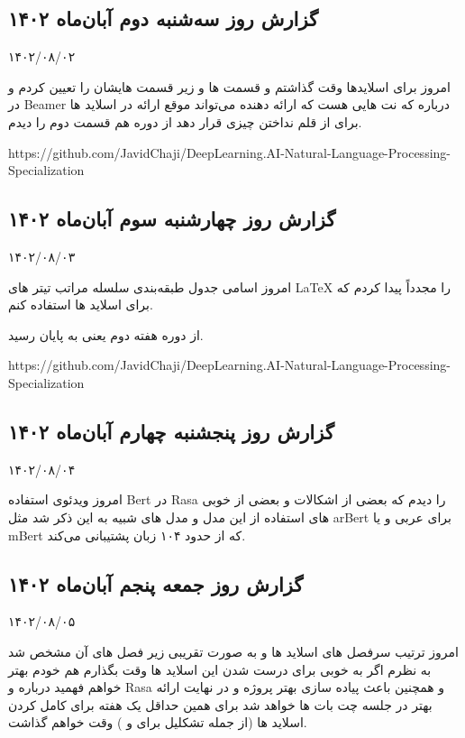 \subsection{گزارش روز سه‌شنبه دوم آبان‌ماه ۱۴۰۲}

۱۴۰۲/۰۸/۰۲

امروز برای اسلایدها وقت گذاشتم و قسمت ها و زیر قسمت هایشان را تعیین کردم و در Beamer درباره  که نت هایی هست که ارائه دهنده می‌تواند موقع ارائه در اسلاید ها برای از قلم نداختن چیزی قرار دهد
از دوره  هم قسمت دوم  را دیدم.

https://github.com/JavidChaji/DeepLearning.AI-Natural-Language-Processing-Specialization


\subsection{گزارش روز چهارشنبه سوم آبان‌ماه ۱۴۰۲}

۱۴۰۲/۰۸/۰۳

امروز اسامی جدول طبقه‌بندی سلسله مراتب تیتر های LaTeX را مجدداً پیدا کردم که برای اسلاید ها استفاده کنم.

از دوره  هفته دوم یعنی  به پایان رسید.

https://github.com/JavidChaji/DeepLearning.AI-Natural-Language-Processing-Specialization


\subsection{گزارش روز پنجشنبه چهارم آبان‌ماه ۱۴۰۲}

۱۴۰۲/۰۸/۰۴

امروز ویدئوی استفاده Bert در Rasa را دیدم که بعضی از اشکالات و بعضی از خوبی های استفاده از این مدل و مدل های شبیه به این ذکر شد مثل arBert برای عربی و یا mBert که از حدود ۱۰۴ زبان پشتیبانی می‌کند.


\subsection{گزارش روز جمعه پنجم آبان‌ماه ۱۴۰۲}

۱۴۰۲/۰۸/۰۵

امروز ترتیب سرفصل های اسلاید ها و به صورت تقریبی زیر فصل های آن مشخص شد به نظرم اگر به خوبی برای درست شدن این اسلاید ها وقت بگذارم هم خودم بهتر خواهم فهمید درباره  و Rasa و همچنین باعث پیاده سازی بهتر پروژه و در نهایت ارائه بهتر در جلسه چت بات ها خواهد شد برای همین حداقل یک هفته برای کامل کردن اسلاید ها (از جمله تشکلیل  برای  و ) وقت خواهم گذاشت.


